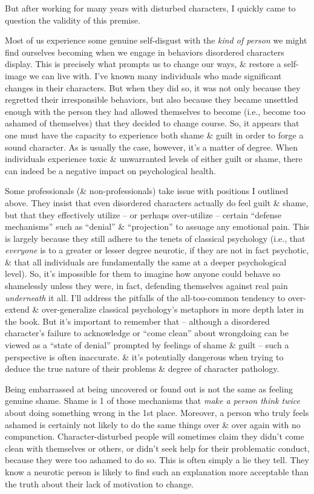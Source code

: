 \documentclass{article}
\numberwithin{equation}{section}
\begin{document}
But after working for many years with disturbed characters, I quickly came to question the validity of this premise.

Most of us experience some genuine self-disgust with  the \textit{kind of person} we might find ourselves becoming when we engage in behaviors disordered characters display. This is precisely what prompts us to change our ways, \& restore a self-image we can live with. I've known many individuals who made significant changes in their characters. But when they did so, it was not only because they regretted their irresponsible behaviors, but also because they became unsettled enough with the person they had allowed themselves to become (i.e., become too ashamed of themselves) that they decided to change course. So, it appears that one must have the capacity to experience both shame \& guilt in order to forge a sound character. As is usually the case, however, it's a matter of degree. When individuals experience toxic \& unwarranted levels of either guilt or shame, there can indeed be a negative impact on psychological health.

Some professionals (\& non-professionals) take issue with positions I outlined above. They insist that even disordered characters actually do feel guilt \& shame, but that they effectively utilize -- or perhaps over-utilize -- certain ``defense mechanisms'' such as ``denial'' \& ``projection'' to assuage any emotional pain. This is largely because they still adhere to the tenets of classical psychology (i.e., that \textit{everyone} is to a greater or lesser degree neurotic, if they are not in fact psychotic, \& that all individuals are fundamentally the same at a deeper psychological level). So, it's impossible for them to imagine how anyone could behave so shamelessly unless they were, in fact, defending themselves against real pain \textit{underneath} it all. I'll address the pitfalls of the all-too-common tendency to over-extend \& over-generalize classical psychology's metaphors in more depth later in the book. But it's important to remember that -- although a disordered character's failure to acknowledge or ``come clean'' about wrongdoing can be viewed as a ``state of denial'' prompted by feelings of shame \& guilt -- such a perspective is often inaccurate. \& it's potentially dangerous when trying to deduce the true nature of their problems \& degree of character pathology.

Being embarrassed at being uncovered or found out is not the same as feeling genuine shame. Shame is 1 of those mechanisms that \textit{make a person think twice} about doing something wrong in the 1st place. Moreover, a person who truly feels ashamed is certainly not likely to do the same things over \& over again with no compunction. Character-disturbed people will sometimes claim they didn't come clean with themselves or others, or didn't seek help for their problematic conduct, because they were too ashamed to do so. This is often simply a lie they tell. They know a neurotic person is likely to find such an explanation more acceptable than the truth about their lack of motivation to change.
\end{document}
